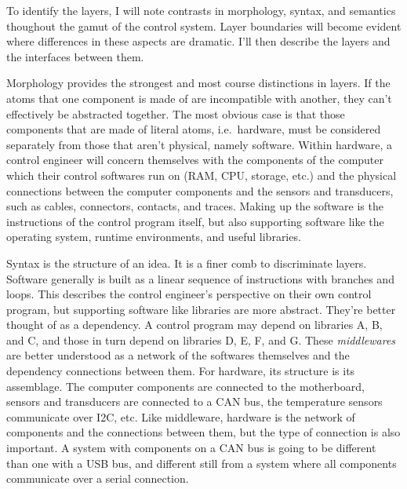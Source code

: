 \documentclass[english,12pt,a4paper,pdftex,eng,utf8]{aaltothesis}
\begin{document}
To identify the layers, I will note contrasts in morphology, syntax, and semantics thoughout the gamut of the control system.  Layer boundaries will become evident where differences in these aspects are dramatic.  I'll then describe the layers and the interfaces between them.

Morphology provides the strongest and most course distinctions in layers.  If the atoms that one component is made of are incompatible with another, they can't effectively be abstracted together.  The most obvious case is that those components that are made of literal atoms, i.e.\ hardware, must be considered separately from those that aren't physical, namely software.  Within hardware, a control engineer will concern themselves with the components of the computer which their control softwares run on (RAM, CPU, storage, etc.) and the physical connections between the computer components and the sensors and transducers, such as cables, connectors, contacts, and traces.  Making up the software is the instructions of the control program itself, but also supporting software like the operating system, runtime environments, and useful libraries.

Syntax is the structure of an idea.  It is a finer comb to discriminate layers.  Software generally is built as a linear sequence of instructions with branches and loops.  This describes the control engineer's perspective on their own control program, but supporting software like libraries are more abstract.  They're better thought of as a dependency.  A control program may depend on libraries A, B, and C, and those in turn depend on libraries D, E, F, and G.  These {\it middlewares\/} are better understood as a network of the softwares themselves and the dependency connections between them.  For hardware, its structure is its assemblage.  The computer components are connected to the motherboard, sensors and transducers are connected to a CAN bus, the temperature sensors communicate over I2C, etc.  Like middleware, hardware is the network of components and the connections between them, but the type of connection is also important.  A system with components on a CAN bus is going to be different than one with a USB bus, and different still from a system where all components communicate over a serial connection.
\end{document}
